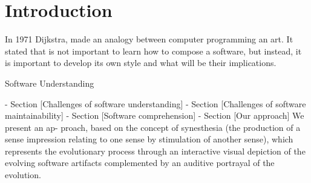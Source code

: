 \chapter{Introduction}

In 1971 Dijkstra, made an analogy between computer programming an art. 
It stated that is not important to learn how to compose a software, but instead, it is important to develop its own style and what will be their implications. 

Software Understanding 

- Section [Challenges of software understanding]
- Section [Challenges of software maintainability]
- Section [Software comprehension]
- Section [Our approach]
We present an ap- proach, based on the concept of synesthesia (the production of a sense impression relating to one sense by stimulation of another sense), which represents the evolutionary process through an interactive visual depiction of the evolving software artifacts complemented by an auditive portrayal of the evolution.
